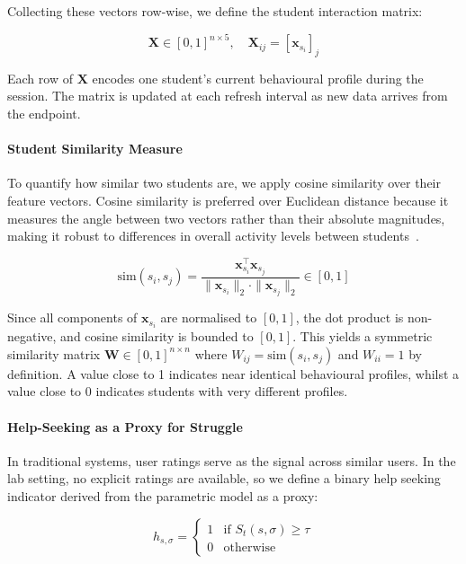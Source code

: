 Collecting these vectors row-wise, we define the student interaction matrix:

\begin{equation}
    \mathbf{X} \in [0,1]^{n \times 5}, \quad \mathbf{X}_{ij} = [\mathbf{x}_{s_i}]_j
\end{equation}

Each row of $\mathbf{X}$ encodes one student's current behavioural profile during the session. The matrix is updated at each refresh interval as new data arrives from the endpoint.

\paragraph{Student Similarity Measure}
To quantify how similar two students are, we apply cosine similarity over their feature vectors. Cosine similarity is preferred over Euclidean distance because it measures the angle between two vectors rather than their absolute magnitudes, making it robust to differences in overall activity levels between students~\cite{manningIntroductionInformationRetrieval2006}.

\begin{equation}
    \text{sim}(s_i, s_j) =
    \frac{\mathbf{x}_{s_i}^{\top} \mathbf{x}_{s_j}}
         {\|\mathbf{x}_{s_i}\|_2 \cdot \|\mathbf{x}_{s_j}\|_2}
    \in [0, 1]
\end{equation}

Since all components of $\mathbf{x}_{s_i}$ are normalised to $[0,1]$, the dot product is non-negative, and cosine similarity is bounded to $[0,1]$. This yields a symmetric similarity matrix
$\mathbf{W} \in [0,1]^{n \times n}$ where $W_{ij} = \text{sim}(s_i,s_j)$ and $W_{ii} = 1$ by definition. A value close to 1 indicates near identical behavioural profiles, whilst a value close to 0 indicates students with very different profiles.

\paragraph{Help-Seeking as a Proxy for Struggle}
In traditional systems, user ratings serve as the signal across similar users. In the lab setting, no explicit ratings are available, so we define a binary help seeking indicator derived from the parametric model as a proxy:

\begin{equation}
    h_{s,\sigma} =
    \begin{cases}
        1 & \text{if } S_t(s,\sigma) \geq \tau \\
        0 & \text{otherwise}
    \end{cases}
\end{equation}

